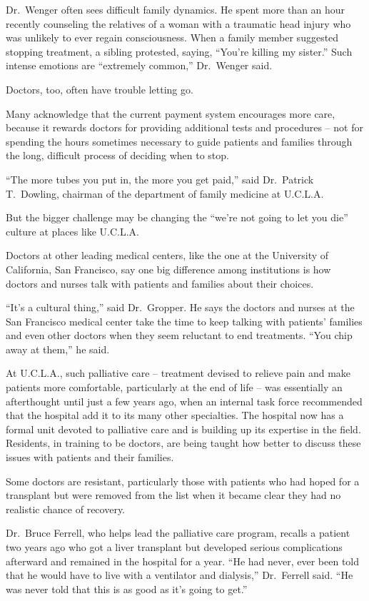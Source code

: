 ﻿\documentclass[12pt]{article}
\begin{document}
Dr.~Wenger often sees difficult family dynamics. He spent more than an hour recently counseling the
relatives of a woman with a traumatic head injury who was unlikely to ever regain consciousness.
When a family member suggested stopping treatment, a sibling protested, saying, ``You're killing my
sister.'' Such intense emotions are ``extremely common,'' Dr.~Wenger said.

Doctors, too, often have trouble letting go.

Many acknowledge that the current payment system encourages more care, because it rewards doctors
for providing additional tests and procedures -- not for spending the hours sometimes necessary to
guide patients and families through the long, difficult process of deciding when to stop.

``The more tubes you put in, the more you get paid,'' said Dr.~Patrick T.~Dowling, chairman of the
department of family medicine at U.C.L.A.

But the bigger challenge may be changing the ``we're not going to let you die'' culture at places
like U.C.L.A.

Doctors at other leading medical centers, like the one at the University of California, San
Francisco, say one big difference among institutions is how doctors and nurses talk with patients
and families about their choices.

``It's a cultural thing,'' said Dr.~Gropper. He says the doctors and nurses at the San Francisco
medical center take the time to keep talking with patients' families and even other doctors when
they seem reluctant to end treatments. ``You chip away at them,'' he said.

At U.C.L.A., such palliative care -- treatment devised to relieve pain and make patients more
comfortable, particularly at the end of life -- was essentially an afterthought until just a few
years ago, when an internal task force recommended that the hospital add it to its many other
specialties. The hospital now has a formal unit devoted to palliative care and is building up its
expertise in the field. Residents, in training to be doctors, are being taught how better to discuss
these issues with patients and their families.

Some doctors are resistant, particularly those with patients who had hoped for a transplant but were
removed from the list when it became clear they had no realistic chance of recovery.

Dr.~Bruce Ferrell, who helps lead the palliative care program, recalls a patient two years ago who
got a liver transplant but developed serious complications afterward and remained in the hospital
for a year. ``He had never, ever been told that he would have to live with a ventilator and
dialysis,'' Dr.~Ferrell said. ``He was never told that this is as good as it's going to get.''
\end{document}
